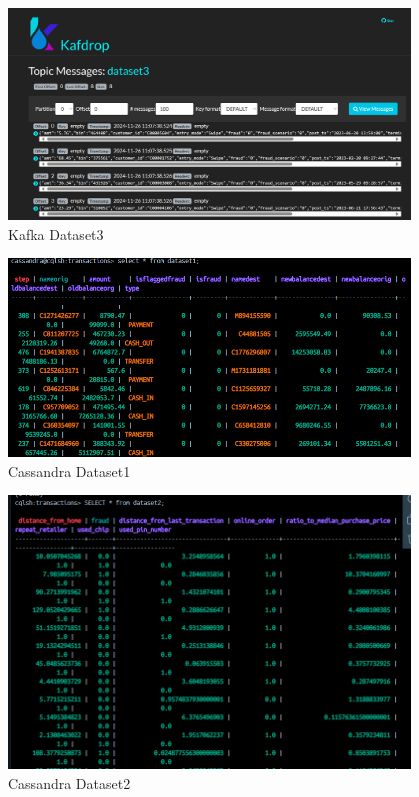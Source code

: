 \documentclass[12pt,a4paper, hidelinks]{article}
\begin{document}
\begin{figure}[htbp]
  \centering
  \includegraphics[width=0.95\textwidth]{images/m2-kafka-3.png}
  \caption{Kafka Dataset3}
  \label{fig:kafka3}
\end{figure}


\begin{figure}[htbp]
  \centering
  \includegraphics[width=0.95\textwidth]{images/m2-dataset-1.png}
  \caption{Cassandra Dataset1}
  \label{fig:cassandra1}
\end{figure}


\begin{figure}[htbp]
  \centering
  \includegraphics[width=0.95\textwidth]{images/m2-dataset-2.png}
  \caption{Cassandra Dataset2}
  \label{fig:cassandra2}
\end{figure}
\end{document}
